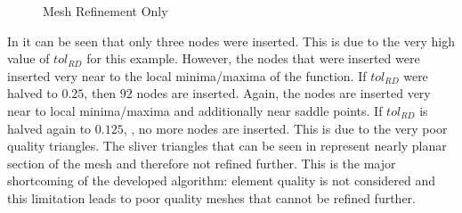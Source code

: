 \begin{figure}[h!]
  \begin{center}
  \label{fig_RefineOnly}


  \caption{Mesh Refinement Only}
  \end{center}
\end{figure}

In  it can be seen that only three nodes were
inserted. This is due to the very high value of $tol_{RD}$ for this
example.  However, the nodes that were inserted were inserted very near
to the local minima/maxima of the function. If $tol_{RD}$ were halved to
$0.25$,  then $92$ nodes are inserted. Again, the
nodes are inserted very near to local minima/maxima and additionally
near saddle points. If $tol_{RD}$ is halved again to $0.125$,
, no more nodes are inserted. This is due to the
very poor quality triangles.  The sliver triangles that can be seen in
 represent nearly planar section
of the mesh and therefore not refined further. This is the major
shortcoming of the developed algorithm: element quality is not
considered and this limitation leads to poor quality meshes that cannot
be refined further.


